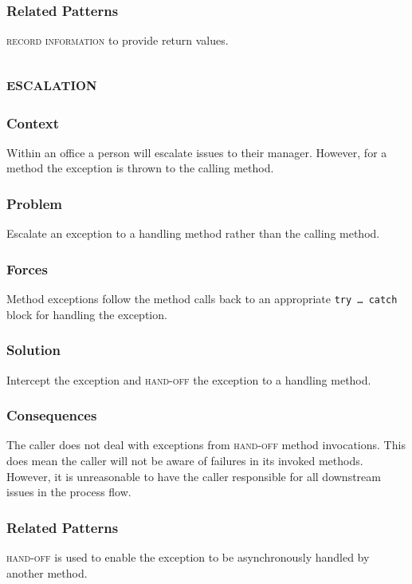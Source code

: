 \documentclass[prodmode]{style/acmlarge}
\begin{document}
\subsubsection*{Related Patterns} \textsc{record information} to provide return
values.



\subsection{\textsc{\textbf{escalation}}}

\subsubsection*{Context} Within an office a person will escalate issues to their
manager.  However, for a method the exception is thrown to the calling method.

\subsubsection*{Problem} Escalate an exception to a handling method rather than
the calling method.

\subsubsection*{Forces} Method exceptions follow the method calls back to an
appropriate \texttt{try~\ldots~catch} block for handling the exception.

\subsubsection*{Solution} Intercept the exception and \textsc{hand-off} the
exception to a handling method.

\subsubsection*{Consequences} The caller does not deal with exceptions from
\textsc{hand-off} method invocations.  This does mean the caller will not be
aware of failures in its invoked methods.  However, it is unreasonable to have
the caller responsible for all downstream issues in the process flow.

\subsubsection*{Related Patterns} \textsc{hand-off} is used to enable the
exception to be asynchronously handled by another method.
\end{document}
